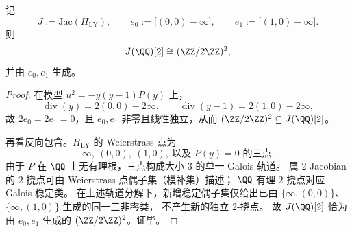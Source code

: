 \begin{theorem}\label{thm:xi-leyang-jacobian-rational-2torsion-complete}
记
\[
J:=\mathrm{Jac}(H_{\mathrm{LY}}),
\qquad
e_0:=\bigl[(0,0)-\infty\bigr],\qquad
e_1:=\bigl[(1,0)-\infty\bigr].
\]
则
\[
J(\QQ)[2]\cong (\ZZ/2\ZZ)^2,
\]
并由 \(e_0,e_1\) 生成。
\end{theorem}
\begin{proof}
在模型 \(u^2=-y(y-1)P(y)\) 上，
\[
\operatorname{div}(y)=2(0,0)-2\infty,\qquad
\operatorname{div}(y-1)=2(1,0)-2\infty,
\]
故 \(2e_0=2e_1=0\)，且 \(e_0,e_1\) 非零且线性独立，从而
\(
(\ZZ/2\ZZ)^2\subseteq J(\QQ)[2]
\)。

再看反向包含。\(H_{\mathrm{LY}}\) 的 Weierstrass 点为
\[
\infty,\ (0,0),\ (1,0),\ \text{以及 }P(y)=0\text{ 的三点}.
\]
由于 \(P\) 在 \(\QQ\) 上无有理根，三点构成大小 \(3\) 的单一 Galois 轨道。
属 \(2\) Jacobian 的 \(2\)-挠点可由 Weierstrass 点偶子集（模补集）描述；
\(\QQ\)-有理 \(2\)-挠点对应 Galois 稳定类。
在上述轨道分解下，新增稳定偶子集仅给出已由
\(\{\infty,(0,0)\}\)、\(\{\infty,(1,0)\}\) 生成的同一三非零类，
不产生新的独立 \(2\)-挠点。
故 \(J(\QQ)[2]\) 恰为由 \(e_0,e_1\) 生成的 \((\ZZ/2\ZZ)^2\)。证毕。
\end{proof}

\endinput

